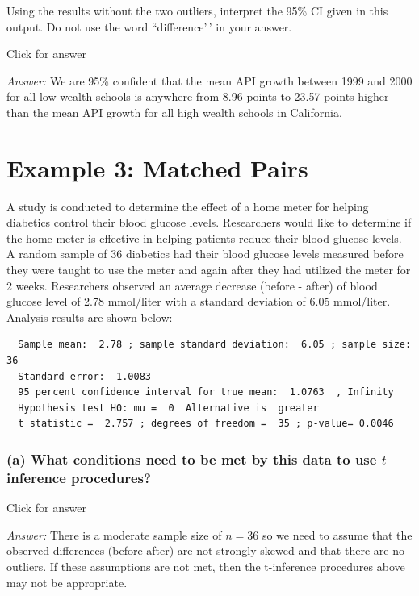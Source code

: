 \documentclass[
]{book}
\begin{document}
Using the results without the two outliers, interpret the 95\% CI given in this output. Do not use the word ``difference'\,' in your answer.

Click for answer

\emph{Answer:} We are 95\% confident that the mean API growth between 1999 and 2000 for all low wealth schools is anywhere from 8.96 points to 23.57 points higher than the mean API growth for all high wealth schools in California.

\hypertarget{example-3-matched-pairs}{%
\section{Example 3: Matched Pairs}\label{example-3-matched-pairs}}

A study is conducted to determine the effect of a home meter for helping diabetics control their blood glucose levels. Researchers would like to determine if the home meter is effective in helping patients reduce their blood glucose levels. A random sample of 36 diabetics had their blood glucose levels measured before they were taught to use the meter and again after they had utilized the meter for 2 weeks. Researchers observed an average decrease (before - after) of blood glucose level of 2.78 mmol/liter with a standard deviation of 6.05 mmol/liter. Analysis results are shown below:

\begin{verbatim}
  Sample mean:  2.78 ; sample standard deviation:  6.05 ; sample size: 36
  Standard error:  1.0083
  95 percent confidence interval for true mean:  1.0763  , Infinity
  Hypothesis test H0: mu =  0  Alternative is  greater
  t statistic =  2.757 ; degrees of freedom =  35 ; p-value= 0.0046
\end{verbatim}

\hypertarget{a-what-conditions-need-to-be-met-by-this-data-to-use-t-inference-procedures}{%
\subsubsection{\texorpdfstring{(a) What conditions need to be met by this data to use \(t\) inference procedures?}{(a) What conditions need to be met by this data to use t inference procedures?}}\label{a-what-conditions-need-to-be-met-by-this-data-to-use-t-inference-procedures}}

Click for answer

\emph{Answer:} There is a moderate sample size of \(n=36\) so we need to assume that the observed differences (before-after) are not strongly skewed and that there are no outliers. If these assumptions are not met, then the t-inference procedures above may not be appropriate.
\end{document}
